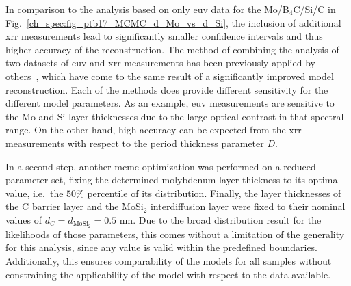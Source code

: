 In comparison to the analysis based on only \gls{euv} data for the Mo/B$_4$C/Si/C in Fig.~\ref{ch_spec:fig_ptb17_MCMC_d_Mo_vs_d_Si}, the inclusion of additional \gls{xrr} measurements lead to significantly smaller confidence intervals and thus higher accuracy of the reconstruction. The method of combining the analysis of two datasets of \gls{euv} and \gls{xrr} measurements has been previously applied by others~\cite{yakunin_combined_2014}, which have come to the same result of a significantly improved model reconstruction. Each of the methods does provide different sensitivity for the different model parameters. As an example, \gls{euv} measurements are sensitive to the Mo and Si layer thicknesses due to the large optical contrast in that spectral range. On the other hand, high accuracy can be expected from the \gls{xrr} measurements with respect to the period thickness parameter $D$.

In a second step, another \gls{mcmc} optimization was performed on a reduced parameter set, fixing the determined molybdenum layer thickness to its optimal value, i.e.~the $50\%$ percentile of its distribution. Finally, the layer thicknesses of the C barrier layer and the MoSi$_2$ interdiffusion layer were fixed to their nominal values of $d_C = d_{\text{MoSi}_2} = 0.5 $ nm. Due to the broad distribution result for the likelihoods of those parameters, this comes without a limitation of the generality for this analysis, since any value is valid within the predefined boundaries. Additionally, this ensures comparability of the models for all samples without constraining the applicability of the model with respect to the data available.

